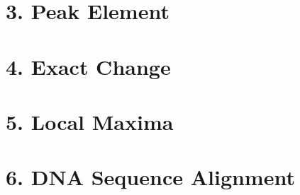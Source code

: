 \documentclass[11pt]{article}
\begin{document}
\newpage
\section*{3. Peak Element}




\newpage
\section*{4. Exact Change}




\newpage
\section*{5. Local Maxima}




\newpage
\section*{6. DNA Sequence Alignment}
\end{document}
